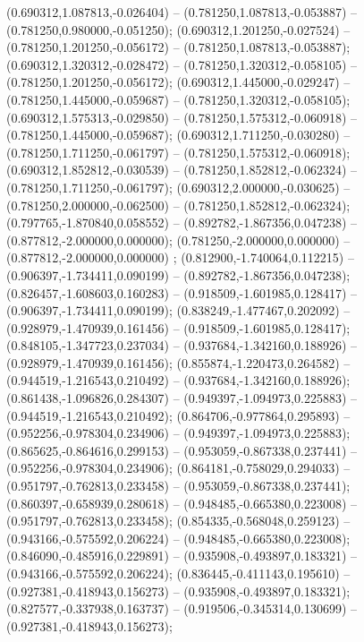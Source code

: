  (0.690312,1.087813,-0.026404) -- (0.781250,1.087813,-0.053887) -- (0.781250,0.980000,-0.051250);
 (0.690312,1.201250,-0.027524) -- (0.781250,1.201250,-0.056172) -- (0.781250,1.087813,-0.053887);
 (0.690312,1.320312,-0.028472) -- (0.781250,1.320312,-0.058105) -- (0.781250,1.201250,-0.056172);
 (0.690312,1.445000,-0.029247) -- (0.781250,1.445000,-0.059687) -- (0.781250,1.320312,-0.058105);
 (0.690312,1.575313,-0.029850) -- (0.781250,1.575312,-0.060918) -- (0.781250,1.445000,-0.059687);
 (0.690312,1.711250,-0.030280) -- (0.781250,1.711250,-0.061797) -- (0.781250,1.575312,-0.060918);
 (0.690312,1.852812,-0.030539) -- (0.781250,1.852812,-0.062324) -- (0.781250,1.711250,-0.061797);
 (0.690312,2.000000,-0.030625) -- (0.781250,2.000000,-0.062500) -- (0.781250,1.852812,-0.062324);
 (0.797765,-1.870840,0.058552) -- (0.892782,-1.867356,0.047238) -- (0.877812,-2.000000,0.000000);
 (0.781250,-2.000000,0.000000) -- (0.877812,-2.000000,0.000000) ;
 (0.812900,-1.740064,0.112215) -- (0.906397,-1.734411,0.090199) -- (0.892782,-1.867356,0.047238);
 (0.826457,-1.608603,0.160283) -- (0.918509,-1.601985,0.128417) -- (0.906397,-1.734411,0.090199);
 (0.838249,-1.477467,0.202092) -- (0.928979,-1.470939,0.161456) -- (0.918509,-1.601985,0.128417);
 (0.848105,-1.347723,0.237034) -- (0.937684,-1.342160,0.188926) -- (0.928979,-1.470939,0.161456);
 (0.855874,-1.220473,0.264582) -- (0.944519,-1.216543,0.210492) -- (0.937684,-1.342160,0.188926);
 (0.861438,-1.096826,0.284307) -- (0.949397,-1.094973,0.225883) -- (0.944519,-1.216543,0.210492);
 (0.864706,-0.977864,0.295893) -- (0.952256,-0.978304,0.234906) -- (0.949397,-1.094973,0.225883);
 (0.865625,-0.864616,0.299153) -- (0.953059,-0.867338,0.237441) -- (0.952256,-0.978304,0.234906);
 (0.864181,-0.758029,0.294033) -- (0.951797,-0.762813,0.233458) -- (0.953059,-0.867338,0.237441);
 (0.860397,-0.658939,0.280618) -- (0.948485,-0.665380,0.223008) -- (0.951797,-0.762813,0.233458);
 (0.854335,-0.568048,0.259123) -- (0.943166,-0.575592,0.206224) -- (0.948485,-0.665380,0.223008);
 (0.846090,-0.485916,0.229891) -- (0.935908,-0.493897,0.183321) -- (0.943166,-0.575592,0.206224);
 (0.836445,-0.411143,0.195610) -- (0.927381,-0.418943,0.156273) -- (0.935908,-0.493897,0.183321);
 (0.827577,-0.337938,0.163737) -- (0.919506,-0.345314,0.130699) -- (0.927381,-0.418943,0.156273);
